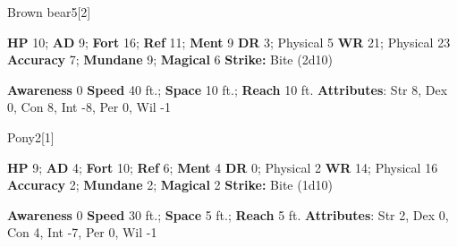   
  \begin{monsection}{Brown bear}{5}[2]
    \vspace{-1em}\vspace{-1em}
    \begin{spellcontent}
      \begin{spelltargetinginfo}
        \pari \textbf{HP} 10;
          \textbf{AD} 9;
          \textbf{Fort} 16;
          \textbf{Ref} 11;
          \textbf{Ment} 9
        \pari \textbf{DR} 3; Physical 5
        \pari \textbf{WR} 21; Physical 23
        \pari \textbf{Accuracy} 7;
          \textbf{Mundane} 9;
          \textbf{Magical} 6
        \pari \textbf{Strike:}
            Bite  (2d10)
      \end{spelltargetinginfo}
    \end{spellcontent}
    \begin{monsterfooter}
      \pari \textbf{Awareness} 0
      \pari \textbf{Speed} 40 ft.;
        \textbf{Space} 10 ft.;
        \textbf{Reach} 10 ft.
      \pari \textbf{Attributes}:
        Str 8, Dex 0, Con 8,
        Int -8, Per 0, Wil -1
    \end{monsterfooter}
  \end{monsection}
  
  
  \begin{monsection}{Pony}{2}[1]
    \vspace{-1em}\vspace{-1em}
    \begin{spellcontent}
      \begin{spelltargetinginfo}
        \pari \textbf{HP} 9;
          \textbf{AD} 4;
          \textbf{Fort} 10;
          \textbf{Ref} 6;
          \textbf{Ment} 4
        \pari \textbf{DR} 0; Physical 2
        \pari \textbf{WR} 14; Physical 16
        \pari \textbf{Accuracy} 2;
          \textbf{Mundane} 2;
          \textbf{Magical} 2
        \pari \textbf{Strike:}
            Bite  (1d10)
      \end{spelltargetinginfo}
    \end{spellcontent}
    \begin{monsterfooter}
      \pari \textbf{Awareness} 0
      \pari \textbf{Speed} 30 ft.;
        \textbf{Space} 5 ft.;
        \textbf{Reach} 5 ft.
      \pari \textbf{Attributes}:
        Str 2, Dex 0, Con 4,
        Int -7, Per 0, Wil -1
    \end{monsterfooter}
  \end{monsection}
  
